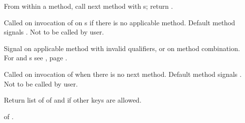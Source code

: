 \begin{LIST}{1cm}
  {
    From within a method, call next method with s; return
    .
  }

  {
    Called on invocation of  on s if
    there is no applicable method.  Default method signals
    .  Not to be called by user.
  }

  {
    Signal  on applicable method with invalid qualifiers, or
    on method combination. For  and s see
    , page \pageref{section:Format}.
  }

  {
    Called on invocation of  when there is no next
    method.  Default method signals .  Not to be called by
    user.
  }

  {
    Return list of  of  and
    \retvalii{\T} if other keys are allowed.
  }

  {
     of .
  }


\end{LIST}

